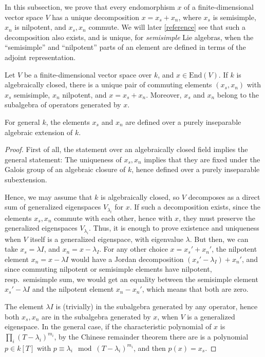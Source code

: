 In this subsection, we prove that every endomorphism $x$ of a finite-dimensional vector space $V$ has a unique decomposition $x=x_s+x_n$, where $x_s$ is semisimple, $x_n$ is nilpotent, and $x_s, x_n$ commute. We will later \ref{reference} see that such a decomposition also exists, and is unique, for \emph{semisimple} Lie algebras, when the ``semisimple'' and ``nilpotent'' parts of an element are defined in terms of the adjoint representation.

\begin{proposition}
\label{proposition-Jordan-endomorphisms}
 Let $V$ be a finite-dimensional vector space over $k$, and $x\in \text{End}(V)$. If $k$ is algebraically closed, there is a unique pair of commuting elements $(x_s, x_n)$ with $x_s$ semisimple, $x_n$ nilpotent, and $x=x_s+x_n$. Moreover, $x_s$ and $x_n$ belong to the subalgebra of operators generated by $x$.
 
 For general $k$, the elements $x_s$ and $x_n$ are defined over a purely inseparable algebraic extension of $k$. 
\end{proposition}

\begin{proof}
 First of all, the statement over an algebraically closed field implies the general statement: The uniqueness of $x_s, x_n$ implies that they are fixed under the Galois group of an algebraic closure of $k$, hence defined over a purely inseparable subextension.
 
 Hence, we may assume that $k$ is algebraically closed, so $V$ decomposes as a direct sum of generalized eigenspaces $V_{\lambda_i}$ for $x$. If such a decomposition exists, since the elements $x_s, x_n$ commute with each other, hence with $x$, they must preserve the generalized eigenspaces $V_{\lambda_i}$. Thus, it is enough to prove existence and uniqueness when $V$ itself is a generalized eigenspace, with eigenvalue $\lambda$. But then, we can take $x_s=\lambda I$, and $x_n = x - \lambda_I$. For any other choice $x=x_s'+x_n'$, the nilpotent element $x_n=x-\lambda I$ would have a Jordan decomposition $(x_s'-\lambda_I) + x_n'$, and since commuting nilpotent or semisimple elements have nilpotent, resp.\ semisimple sum, we would get an equality between the semisimple element $x_s'-\lambda I$ and the nilpotent element $x_n-x_n'$, which means that both are zero.
 
 The element $\lambda I$ is (trivially) in the subalgebra generated by any operator, hence both $x_s, x_n$ are in the subalgebra generated by $x$, when $V$ is a generalized eigenspace. In the general case, if the characteristic polynomial of $x$ is $\prod_i (T-\lambda_i)^{m_i}$, by the Chinese remainder theorem there are is a polynomial $p\in k[T]$ with $p\equiv \lambda_i \mod (T-\lambda_i)^{m_i}$, and then $p(x)=x_s$. 
\end{proof}

